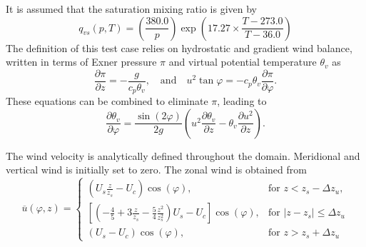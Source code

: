 \documentclass[times,doublespace]{fldauth}
\newcommand{\pdiff}[2]{\frac{\partial #1}{\partial #2}}
\begin{document}
{It is assumed that the saturation mixing ratio is given by
\begin{equation}
q_{vs}(p,T) = \left( \frac{380.0}{p} \right) \exp\left(17.27 \times \frac{T-273.0}{T-36.0}\right)
\end {equation}  The definition of this test case relies on hydrostatic and gradient wind balance, written in terms of Exner pressure $\pi$ and virtual potential temperature $\theta_v$ as
\begin{equation} \label{eq:BalanceEq}
\pdiff{\pi}{z} = - \frac{g}{c_p \theta_v}, \quad \mbox{and} \quad u^2 \tan \varphi = - c_p \theta_v \pdiff{\pi}{\varphi}.
\end{equation}  These equations can be combined to eliminate $\pi$, leading to
\begin{equation} \label{eq:CombinedBalanceEq}
\pdiff{\theta_v}{\varphi} = \frac{\sin (2 \varphi)}{2 g} \left( u^2 \pdiff{\theta_v}{z} - \theta_v \pdiff{u^2}{z} \right).
\end{equation}

The wind velocity is analytically defined throughout the domain.  Meridional and vertical wind is initially set to zero.  The zonal wind is obtained from
\begin{equation}
\overline{u}(\varphi,z) = \left\{ \begin{array}{ll}
\displaystyle \left(U_s\frac{z}{z_s}-U_c\right)\cos(\varphi), & \mbox{for $z < z_s - \Delta z_u$}, \\[2.0ex]
\displaystyle \left[ \left(-\frac{4}{5}+3\frac{z}{z_s}-\frac{5}{4}\frac{z^2}{z_s^2}\right)U_s-U_c \right] \cos(\varphi), & \mbox{for $\vert z-z_s \vert \leq \Delta z_u$} \\[2.0ex]
\displaystyle \left(U_s-U_c\right)\cos(\varphi), & \mbox{for $z > z_s + \Delta z_u$}
\end{array} \right.
\end{equation}

}
\end{document}

